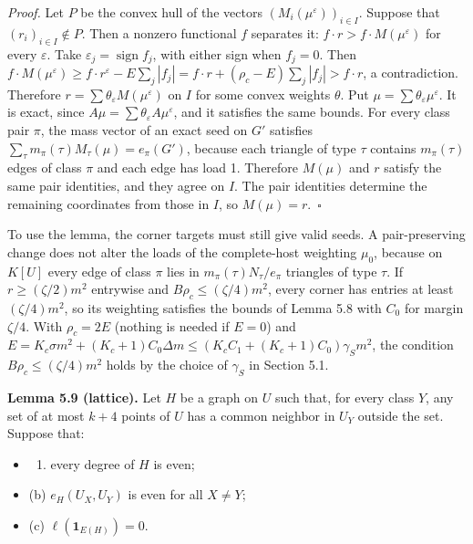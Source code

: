 \documentclass[english,11pt,a4paper]{article}
\providecommand{\tightlist}{\setlength{\itemsep}{0pt}\setlength{\parskip}{0pt}}
\begin{document}
\emph{Proof.} Let \(P\) be the convex hull of the vectors \((M_i(\mu^\varepsilon))_{i\in I}\). Suppose that \((r_i)_{i\in I}\notin P\). Then a nonzero functional \(f\) separates it: \(f\cdot r>f\cdot M(\mu^\varepsilon)\) for every \(\varepsilon\). Take \(\varepsilon_j=\operatorname{sign}f_j\), with either sign when \(f_j=0\). Then \(f\cdot M(\mu^\varepsilon)\ge f\cdot r^\varepsilon-E\sum_j|f_j|=f\cdot r+(\rho_c-E)\sum_j|f_j|>f\cdot r\), a contradiction. Therefore \(r=\sum\theta_\varepsilon M(\mu^\varepsilon)\) on \(I\) for some convex weights \(\theta\). Put \(\mu=\sum\theta_\varepsilon\mu^\varepsilon\). It is exact, since \(A\mu=\sum\theta_\varepsilon A\mu^\varepsilon\), and it satisfies the same bounds. For every class pair \(\pi\), the mass vector of an exact seed on \(G'\) satisfies \(\sum_\tau m_\pi(\tau)M_\tau(\mu)=e_\pi(G')\), because each triangle of type \(\tau\) contains \(m_\pi(\tau)\) edges of class \(\pi\) and each edge has load 1. Therefore \(M(\mu)\) and \(r\) satisfy the same pair identities, and they agree on \(I\). The pair identities determine the remaining coordinates from those in \(I\), so \(M(\mu)=r\).~\(\square\)

To use the lemma, the corner targets must still give valid seeds. A pair-preserving change does not alter the loads of the complete-host weighting \(\mu_0\), because on \(K[U]\) every edge of class \(\pi\) lies in \(m_\pi(\tau)N_\tau/e_\pi\) triangles of type \(\tau\). If \(r\ge(\zeta/2)m^2\) entrywise and \(B\rho_c\le(\zeta/4)m^2\), every corner has entries at least \((\zeta/4)m^2\), so its weighting satisfies the bounds of Lemma 5.8 with \(C_0\) for margin \(\zeta/4\). With \(\rho_c=2E\) (nothing is needed if \(E=0\)) and \(E=K_c\sigma m^2+(K_c+1)C_0\Delta m\le(K_cC_1+(K_c+1)C_0)\gamma_Sm^2\), the condition \(B\rho_c\le(\zeta/4)m^2\) holds by the choice of \(\gamma_S\) in Section 5.1.

\textbf{Lemma 5.9 (lattice).} Let \(H\) be a graph on \(U\) such that, for every class \(Y\), any set of at most \(k+4\) points of \(U\) has a common neighbor in \(U_Y\) outside the set. Suppose that:

\begin{itemize}
\tightlist
\item
  \begin{enumerate}
  \def\labelenumi{(\alph{enumi})}
  \tightlist
  \item
    every degree of \(H\) is even;
  \end{enumerate}
\item
  (b) \(e_H(U_X,U_Y)\) is even for all \(X\ne Y\);
\item
  (c) \(\ell(\mathbf 1_{E(H)})=0\).
\end{itemize}
\end{document}
